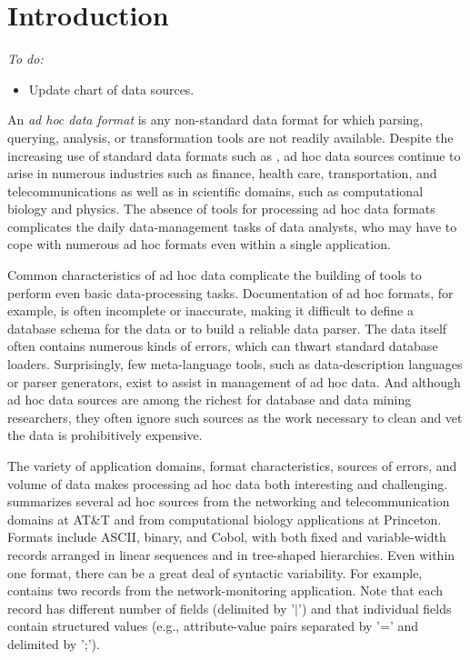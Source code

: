 \section{Introduction}
\label{sec:intro}

{\em
To do:
\begin{itemize}
\item Update chart of data sources.
\end{itemize}
}

An {\em ad hoc data format} is any non-standard data format for which
parsing, querying, analysis, or transformation tools are not readily
available.  Despite the increasing use of standard data formats such
as \xml{}, ad hoc data sources continue to arise in numerous
industries such as finance, health care, transportation, and
telecommunications as well as in scientific domains, such as
computational biology and physics.  The absence of tools for
processing ad hoc data formats complicates the daily data-management
tasks of data analysts, who may have to cope with numerous ad
hoc formats even within a single application.  

Common characteristics of ad hoc data complicate the building of tools
to perform even basic data-processing tasks.  Documentation of ad hoc
formats, for example, is often incomplete or inaccurate, making it
difficult to define a database schema for the data or to build a
reliable data parser.  The data itself often contains numerous kinds
of errors, which can thwart standard database loaders.  Surprisingly,
few meta-language tools, such as data-description languages or parser
generators, exist to assist in management of ad hoc data.  And
although ad hoc data sources are among the richest for database and
data mining researchers, they often ignore such sources as the work
necessary to clean and vet the data is prohibitively expensive.


The variety of application domains, format characteristics, sources of
errors, and volume of data makes processing ad hoc data both
interesting and challenging.   summarizes
several ad hoc sources from the networking and telecommunication
domains at AT\&T and from computational biology applications at
Princeton.  Formats include ASCII, binary, and Cobol, with both fixed
and variable-width records arranged in linear sequences and in
tree-shaped hierarchies.  Even within one format, there
can be a great deal of syntactic variability.  For example,
 contains two records from the
network-monitoring application.  Note that each record has different
number of fields (delimited by '$|$') and that individual fields contain
structured values (e.g., attribute-value pairs separated by '=' and
delimited by ';').

